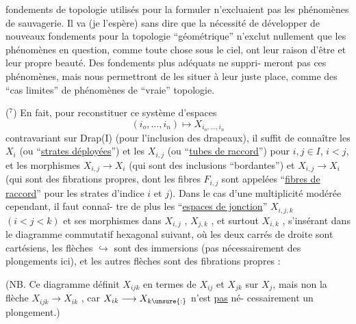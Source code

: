 
fondements de topologie utilisés pour la formuler n'excluaient
pas les phénomènes de sauvagerie. Il va (je l'espère) sans dire
que la nécessité de développer de nouveaux fondements pour la
topologie ``géométrique'' n'exclut nullement que les phénomènes en
question, comme toute chose sous le ciel, ont leur raison d'être
et leur propre beauté. Des fondements plus adéquats ne suppri-%
meront pas ces phénomènes, mais nous permettront de les situer à
leur juste place, comme des ``cas limites'' de phénomènes de ``vraie''
topologie.

($^7$) En fait, pour reconstituer ce système d'espaces
\[ (i_o,\ldots,i_n) \longmapsto X_{i_o,\ldots,i_n} \]
contravariant sur Drap(I) (pour l'inclusion des drapeaux), il
suffit de connaître les $X_i$ (ou ``\uline{strates déployées}'') et les $X_{i,j}$
(ou ``\uline{tubes de raccord}'') pour $i,j \in I$, $i < j$, et les morphismes
$X_{i,j} \longrightarrow X_i$ (qui sont des inclusions ``bordantes'') et $X_{i,j} \rightarrow X_i$
(qui sont des fibrations propres, dont les fibres $F_{i,j}$ sont
appelées ``\uline{fibres de raccord}'' pour les strates d'indice $i$ et $j$).
Dans le cas d'une multiplicité modérée cependant, il faut connaî-%
tre de plus les ``\uline{espaces de jonction}'' $X_{i,j,k}$ $(i < j < k)$ et ses
morphismes dans $X_{i,j}$ , $X_{j,k}$ , et surtout $X_{i,k}$ , s'insérant dans
le diagramme commutatif hexagonal suivant, où les deux carrés de
droite sont cartésiens, les flèches $\hookrightarrow$ sont des immersions (pas
nécessairement des plongements ici), et les autres flèches sont
des fibrations propres :


(NB. Ce diagramme définit $X_{ijk}$ en termes de $X_{ij}$ et $X_{jk}$ sur $X_j$,
mais non la flèche $X_{ijk} \longrightarrow X_{ik}$ , car $X_{ik} \longrightarrow X_{k\unsure{:}}$ n'est \uline{pas} né-%
cessairement un plongement.)

